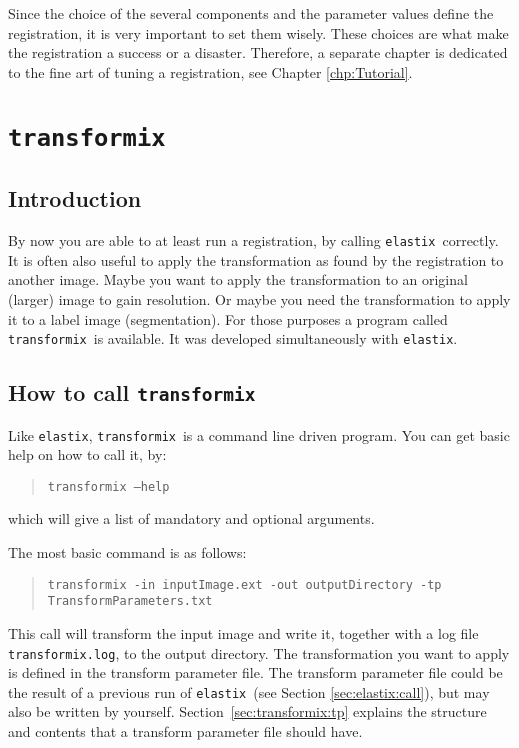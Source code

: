 \documentclass[]{report}
\newcommand{\elastix}{\texttt{elastix}}
\newcommand{\transformix}{\texttt{transformix}}
\begin{document}
Since the choice of the several components and the parameter values
define the registration, it is very important to set them wisely.
These choices are what make the registration a success or a disaster.
Therefore, a separate chapter is dedicated to the fine art of tuning
a registration, see Chapter \ref{chp:Tutorial}.



\chapter{\transformix}\label{chp:transformix}

\section{Introduction}

By now you are able to at least run a registration, by calling
\elastix\ correctly. It is often also useful to apply the
transformation as found by the registration to another image.
Maybe you want to apply the transformation to an original (larger)
image to gain resolution. Or maybe you need the transformation to
apply it to a label image (segmentation). For those purposes a
program called \transformix\ is available. It was developed
simultaneously with \elastix.

\section{How to call \transformix}\label{sec:calltransformix}

Like \elastix, \transformix\ is a command line driven program. You
can get basic help on how to call it, by:
\begin{quote}
\texttt{transformix --help}
\end{quote}
which will give a list of mandatory and optional arguments.

The most basic command is as follows:
\begin{quote}
\texttt{transformix -in inputImage.ext -out outputDirectory -tp
TransformParameters.txt}
\end{quote}
This call will transform the input image and write it, together
with a log file \texttt{transformix.log}, to the output directory.
The transformation you want to apply is defined in the transform
parameter file. The transform parameter file could be the result
of a previous run of \elastix\ (see Section
\ref{sec:elastix:call}), but may also be written by yourself.
Section~\ref{sec:transformix:tp} explains the structure and
contents that a transform parameter file should have.
\end{document}

